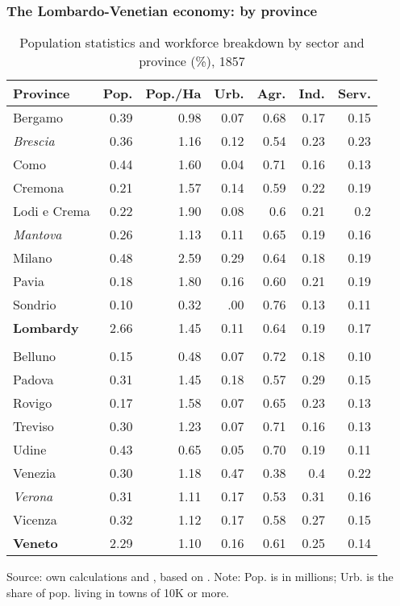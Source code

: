 \documentclass[10pt]{beamer}
\begin{document}
\begin{frame}
    \frametitle{The Lombardo-Venetian economy: by province}

\begin{table}[!h]
\caption{Population statistics and workforce breakdown by sector and province (\%), 1857}
\centering
\fontsize{7}{7}\selectfont

    \begin{tabular}{l r r r r r r}  
        \toprule
        Province & Pop. & Pop./Ha & Urb. & Agr. & Ind. & Serv.    \\ 
        \midrule
        Bergamo & 0.39 & 0.98 & 0.07 & 0.68 & 0.17 & 0.15 \\
        \textit{Brescia} & 0.36 & 1.16 & 0.12 & 0.54 & 0.23 & 0.23 \\
        Como & 0.44 & 1.60 & 0.04 & 0.71 & 0.16 & 0.13 \\
        Cremona & 0.21 & 1.57 & 0.14 & 0.59 & 0.22 & 0.19 \\
        Lodi e Crema & 0.22 & 1.90 & 0.08 & 0.6 & 0.21 & 0.2 \\
        \textit{Mantova} & 0.26 & 1.13 & 0.11 & 0.65 & 0.19 & 0.16 \\
        Milano & 0.48 & 2.59 & 0.29 & 0.64 & 0.18 & 0.19 \\
        Pavia & 0.18 & 1.80 & 0.16 & 0.60 & 0.21 & 0.19 \\
        Sondrio & 0.10 & 0.32 & .00 & 0.76 & 0.13 & 0.11 \\
        \textbf{Lombardy} & 2.66 & 1.45 & 0.11 & 0.64 & 0.19 & 0.17 \\
         &  & &  &  &  \\
        Belluno & 0.15 & 0.48 & 0.07 & 0.72 & 0.18 & 0.10 \\
        Padova & 0.31 &1.45 & 0.18 & 0.57 & 0.29 & 0.15 \\
        Rovigo & 0.17 & 1.58 & 0.07 & 0.65 & 0.23 & 0.13 \\
        Treviso & 0.30 & 1.23 & 0.07 & 0.71 & 0.16 & 0.13 \\
        Udine & 0.43 & 0.65 & 0.05 & 0.70 & 0.19 & 0.11 \\
        Venezia & 0.30 & 1.18 & 0.47 & 0.38 & 0.4 & 0.22 \\
        \textit{Verona} & 0.31 & 1.11 & 0.17 & 0.53 & 0.31 & 0.16 \\
        Vicenza & 0.32 & 1.12 & 0.17 & 0.58 & 0.27 & 0.15 \\
        \textbf{Veneto} & 2.29 & 1.10 & 0.16 & 0.61 & 0.25 & 0.14 \\
        \bottomrule    
    \end{tabular}
    
    Source: own calculations and \cite{chilosi2021}, based on \cite{maic1862}. Note: Pop. is in millions; Urb. is the share of pop. living in towns of 10K or more.

\end{table}

  
\end{frame}
\end{document}
